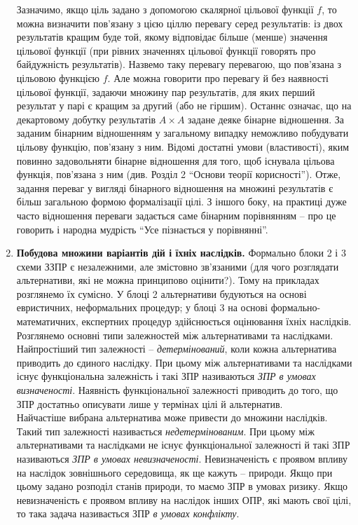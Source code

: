 \begin{enumerate}
	Зазначимо, якщо ціль задано з допомогою скалярної цільової функції $f$, то можна визначити пов'язану з цією ціллю перевагу серед результатів: із двох результатів кращим буде той, якому відповідає більше (менше) значення цільової функції (при рівних значеннях цільової функції говорять про байдужність результатів). Назвемо таку перевагу перевагою, що пов'язана з цільовою функцією $f$. Але можна говорити про перевагу й без наявності цільової функції, задаючи множину пар результатів, для яких перший результат у парі є кращим за другий (або не гіршим). Останнє означає, що на декартовому добутку результатів $A \times A$ задане деяке бінарне відношення. За заданим бінарним відношенням у загальному випадку неможливо побудувати цільову функцію, пов'язану з ним. Відомі достатні умови (властивості), яким повинно задовольняти бінарне відношення для того, щоб існувала цільова функція, пов'язана з ним (див. Розділ 2 ``Основи теорії корисності''). Отже, задання переваг у вигляді бінарного відношення на множині результатів є більш загальною формою формалізації цілі. З іншого боку, на практиці дуже часто відношення переваги задається саме бінарним порівнянням -- про це говорить і народна мудрість ``Усе пізнається у порівнянні''.
	
	\item \textbf{Побудова множини варіантів дій і їхніх наслідків.} Формально блоки 2 і 3 схеми ЗЗПР є незалежними, але змістовно зв'язаними (для чого розглядати альтернативи, які не можна принципово оцінити?). Тому на прикладах розглянемо їх сумісно. У блоці 2 альтернативи будуються на основі евристичних, неформальних процедур; у блоці 3 на основі формально-математичних, експертних процедур здійснюється оцінювання їхніх наслідків. \\
	
    Розглянемо основні типи залежностей між альтернативами та наслідками. \\
    
    Найпростіший тип залежності -- \textit{детермінований}, коли кожна альтернатива приводить до єдиного наслідку. При цьому між альтернативами та наслідками існує функціональна залежність і такі ЗПР називаються \textit{ЗПР в умовах визначеності}. Наявність функціональної залежності приводить до того, що ЗПР достатньо описувати лише у термінах цілі й альтернатив. \\
    
    Найчастіше вибрана альтернатива може привести до множини наслідків. Такий тип залежності називається \textit{недетермінованим}. При цьому між альтернативами та наслідками не існує функціональної залежності й такі ЗПР називаються \textit{ЗПР в умовах невизначеності}. Невизначеність є проявом впливу на наслідок зовнішнього середовища, як ще кажуть -- природи. Якщо при цьому задано розподіл станів природи, то маємо ЗПР в умовах ризику. Якщо невизначеність є проявом впливу на наслідок інших ОПР, які мають свої цілі, то така задача називається ЗПР \textit{в умовах конфлікту}. \\
    

\end{enumerate}
